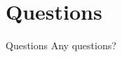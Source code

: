 \section
  {Questions}

  \begin{frame}{Questions}
	  \centering
	Any questions?
  \end{frame}
%
%
%  
%
%
%
%  
%
%



